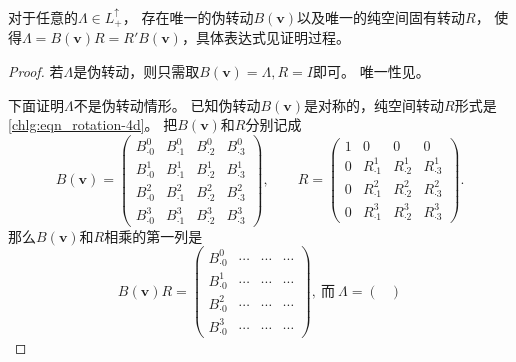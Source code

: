 \begin{theorem} \label{chlg:thm_lorentz-decompose-r}
    对于任意的$ \Lambda \in L^{\uparrow}_{+}$，
    存在唯一的伪转动$B(\boldsymbol{v})$以及唯一的纯空间固有转动$R$，
    使得$\Lambda = B(\boldsymbol{v}) R = R'B(\boldsymbol{v})$，具体表达式见证明过程。
\end{theorem}
\begin{proof}
    若$\Lambda$是伪转动，则只需取$B(\boldsymbol{v})=\Lambda,R=I$即可。
    唯一性见。
    
    下面证明$\Lambda$不是伪转动情形。
    已知伪转动$B(\boldsymbol{v})$是对称的，纯空间转动$R$形式是\eqref{chlg:eqn_rotation-4d}。
    把$B(\boldsymbol{v})$和$R$分别记成
    \begin{equation}
        B(\boldsymbol{v}) = \begin{pmatrix}
            B^0_{\cdot 0}  & B^0_{\cdot 1} & B^0_{\cdot 2} & B^0_{\cdot 3} \\
            B^1_{\cdot 0}  & B^1_{\cdot 1} & B^1_{\cdot 2} & B^1_{\cdot 3} \\
            B^2_{\cdot 0}  & B^2_{\cdot 1} & B^2_{\cdot 2} & B^2_{\cdot 3} \\
            B^3_{\cdot 0}  & B^3_{\cdot 1} & B^3_{\cdot 2} & B^3_{\cdot 3}
        \end{pmatrix}, \qquad
        R = \begin{pmatrix}
            1    & 0 & 0 & 0 \\
            0 & R^1_{\cdot 1} & R^1_{\cdot 2} & R^1_{\cdot 3} \\
            0 & R^2_{\cdot 1} & R^2_{\cdot 2} & R^2_{\cdot 3} \\
            0 & R^3_{\cdot 1} & R^3_{\cdot 2} & R^3_{\cdot 3}
        \end{pmatrix}.
    \end{equation}
    那么$B(\boldsymbol{v})$和$R$相乘的第一列是
    \begin{equation}\label{chlg:eqn_ld-tmp1}
        B(\boldsymbol{v})R=\begin{pmatrix}
            B^0_{\cdot 0} & \cdots & \cdots& \cdots\\
            B^1_{\cdot 0} & \cdots & \cdots& \cdots\\
            B^2_{\cdot 0} & \cdots & \cdots& \cdots\\
            B^3_{\cdot 0} & \cdots & \cdots& \cdots
        \end{pmatrix},\ \text{而}\
        \Lambda=\begin{pmatrix}

\end{pmatrix}
\end{equation}
\end{proof}
